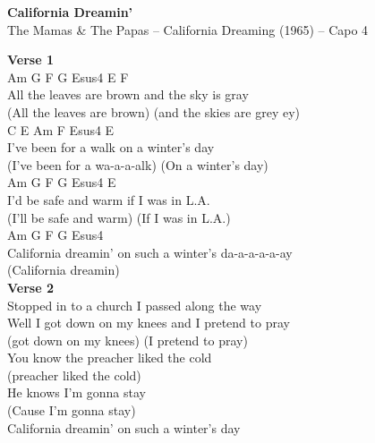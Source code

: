 \documentclass[a4paper]{article}
\begin{document}
    \begin{center}
        \textbf{California Dreamin'}
        ~\\
        The Mamas \& The Papas -- California Dreaming (1965)
         -- Capo 4
    \end{center}
    {
        \scriptsize
        \textbf{Verse 1}
        ~\\
        {
            \cutive
            \obeyspaces
                   Am         G          F       G      Esus4                  E     F
\\
All the leaves are brown                 and the sky is gray
\\
                     (All the leaves are brown)              (and the skies are grey ey)
\\
                 C           E     Am            F        Esus4               E
\\
I've been for a walk                        on a winter's day
\\
                 (I've been for a wa-a-a-alk)                (On a winter's day)
\\
                 Am         G        F            G      Esus4             E
\\
I'd be safe and warm                         if I was in L.A.
\\
                   (I'll be safe and warm)                    (If I was in L.A.)
\\
          Am             G      F            G               Esus4
\\
California dreamin'                       on such a winter's da-a-a-a-a-ay
\\
                    (California dreamin)
\\

        }
        \textbf{Verse 2}
        ~\\
        {
            \cutive
            \obeyspaces
Stopped in to a church     I passed along the way
\\
Well I got down on my knees                  and I pretend to pray
\\
                      (got down on my knees)                      (I pretend to pray)
\\
You know the preacher liked the cold
\\
                                (preacher liked the cold)
\\
He knows I'm gonna stay
\\
                          (Cause I'm gonna stay)
\\
California dreamin' on such a winter's day
\\

}}
\end{document}
